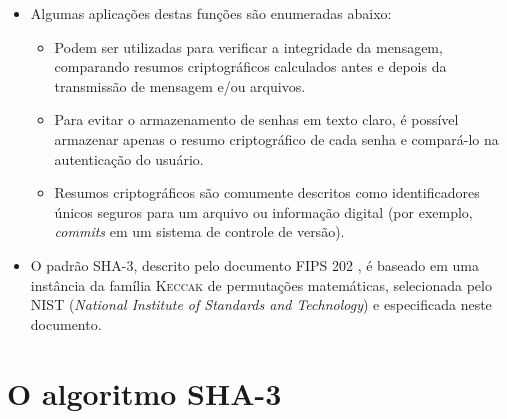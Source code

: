 \documentclass{article}
\begin{document}
\begin{itemize}
\item Algumas aplicações destas funções são enumeradas abaixo:

\begin{itemize}

\item Podem ser utilizadas para verificar a integridade da mensagem, comparando
resumos criptográficos calculados antes e depois da transmissão de mensagem
e/ou arquivos.

\item Para evitar o armazenamento de senhas em texto claro, é possível
armazenar apenas o resumo criptográfico de cada senha e compará-lo na
autenticação do usuário.

\item Resumos criptográficos são comumente descritos como identificadores
únicos seguros para um arquivo ou informação digital (por exemplo,
\emph{commits} em um sistema de controle de versão).

\end{itemize}

\item O padrão SHA-3, descrito pelo documento FIPS 202 \cite{Dworkin2015}, é
baseado em uma instância da família \textsc{Keccak} de permutações matemáticas,
selecionada pelo NIST (\emph{National Institute of Standards and Technology})
e especificada neste documento.

\end{itemize}

\section{O algoritmo SHA-3}
\end{document}
